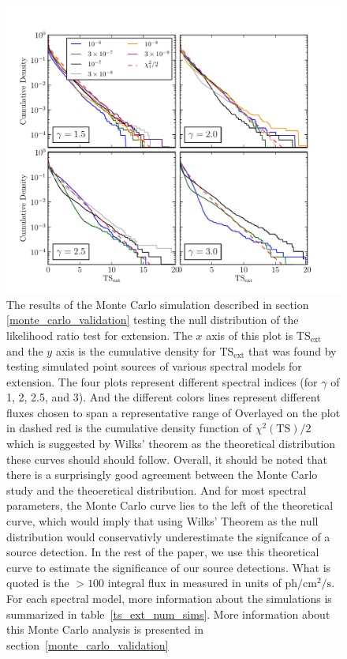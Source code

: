 \documentclass[preprint]{aastex}
\newcommand{\mev}{\text{MeV}\xspace}
\newcommand{\s}{\text{s}\xspace}
\newcommand{\ph}{\text{ph}\xspace}
\newcommand{\cm}{\text{cm}\xspace}
\newcommand{\tsext}{{\ensuremath{\text{TS}_\text{ext}}}\xspace}
\newcommand{\ts}{\text{TS}\xspace}
\begin{document}
\clearpage
\begin{figure}
  \begin{center}
    \includegraphics{mc_plots/ts_ext_emin_1000.pdf}
    \end{center}
    \caption{
    The results of the Monte Carlo simulation described in section
    \ref{monte_carlo_validation} testing the null distribution of
    the likelihood ratio test for extension.  The $x$ axis of this
    plot is \tsext and the $y$ axis is the cumulative density for
    \tsext that was found by testing simulated point sources of
    various spectral models for extension. The four plots represent
    different spectral indices (for $\gamma$ of 1, 2, 2.5, and 3).
    And the different colors lines represent different fluxes chosen
    to span a representative range of Overlayed on the plot in dashed
    red is the cumulative density function of $\chi^2(\ts)/2$ which is
    suggested by Wilks' theorem as the theoretical distribution these
    curves should should follow.  Overall, it should be noted that there
    is a surprisingly good agreement between the Monte Carlo study and
    the theoeretical distribution. And for most spectral parameters, the
    Monte Carlo curve lies to the left of the theoretical curve, which
    would imply that using Wilks' Theorem as the null distribution would
    conservativly underestimate the signifcance of a source detection. In
    the rest of the paper, we use this theoretical curve to estimate
    the significance of our source detections.  What is quoted is the
    $>100$ \mev integral flux in measured in units of $\ph/\cm^2/\s$.
    For each spectral model, more information about the simulations is
    summarized in table~\ref{ts_ext_num_sims}. More
    information about this Monte Carlo analysis is presented in
    section~\ref{monte_carlo_validation}
    }\label{ts_ext_mc}
  \end{figure}
\end{document}
